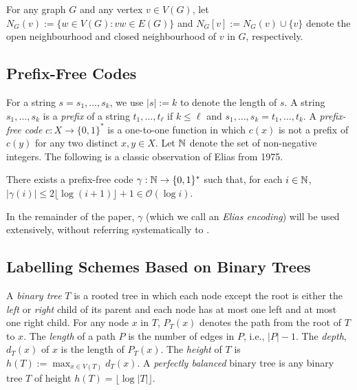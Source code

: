 \documentclass[kpfonts]{patmorin}
\newcommand{\Oh}{\mathcal{O}}
\let\le\leqslant
\begin{document}
For any graph $G$ and any vertex $v\in V(G)$, let $N_G(v):=\{w\in V(G): vw\in E(G)\}$ and $N_G[v]:=N_G(v)\cup\{v\}$ denote the open neighbourhood and closed neighbourhood of $v$ in $G$, respectively.

\subsection{Prefix-Free Codes}

For a string $s=s_1,\ldots,s_k$, we use $|s|:=k$ to denote the length of $s$.
A string $s_1,\ldots,s_k$ is a \emph{prefix} of a string $t_1,\ldots,t_\ell$ if $k\le \ell$ and $s_1,\ldots,s_k=t_1,\ldots,t_k$.  A \emph{prefix-free code} $c:X\to\{0,1\}^*$ is a one-to-one function in which $c(x)$ is not a prefix of $c(y)$ for any two distinct $x,y\in X$.  Let $\mathbb{N}$ denote the set of non-negative integers.  The following is a classic observation of Elias from 1975.


\begin{lem}
    There exists a prefix-free code $\gamma:\mathbb{N}\to\{0,1\}^*$ such that, for each $i\in\mathbb{N}$, $|\gamma(i)|\le 2\lfloor\log(i+1)\rfloor + 1\in \Oh(\log i)$.
  \end{lem}

  In the remainder of the paper, $\gamma$ (which we call an \emph{Elias encoding}) will be used extensively, without referring systematically to .

\subsection{Labelling Schemes Based on Binary Trees}

A \emph{binary tree} $T$ is a rooted tree in which each node except the root is either the \emph{left} or \emph{right} child of its parent and each node has at most one left and at most one right child.  For any node $x$ in $T$, $P_T(x)$ denotes the path from the root of $T$ to $x$.  The \emph{length} of a path $P$ is the number of edges in $P$, i.e., $|P|-1$.  The \emph{depth}, $d_T(x)$ of $x$ is the length of $P_T(x)$.  The \emph{height} of $T$ is $h(T):=\max_{x\in V(T)} d_T(x)$.  A \emph{perfectly balanced} binary tree is any binary tree $T$ of height $h(T)=\lfloor\log|T|\rfloor$.
\end{document}
